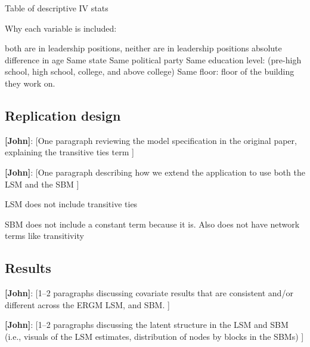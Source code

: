 \documentclass[fleqn,12pt]{wlscirep}
\begin{document}
Table of descriptive IV stats

Why each variable is included:

both are in leadership positions, 
neither are in leadership positions 
absolute difference in age
Same state
Same political party
Same education level: (pre-high school, high school, college, and above college)
Same floor: floor of the building they work on.


\subsection{Replication design}

 {\bf [John]}: [One paragraph reviewing the model specification in the original paper, explaining the transitive ties term ]
 
 

 {\bf [John]}: [One paragraph describing how we extend the application to use both the LSM and the SBM ]

LSM does not include transitive ties

SBM does not include a constant term because it is. Also does not have network terms like transitivity


\subsection{Results}

 {\bf [John]}: [1--2 paragraphs discussing covariate results that are consistent and/or different across the ERGM LSM, and SBM. ]


 {\bf [John]}: [1--2 paragraphs discussing the latent structure in the LSM and SBM (i.e., visuals of the LSM estimates, distribution of nodes by blocks in the SBMs) ]
\end{document}
